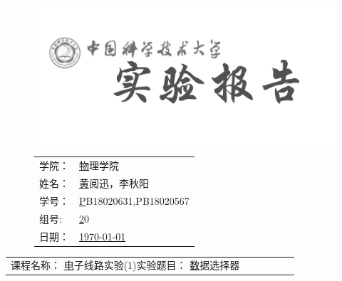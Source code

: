 \documentclass[a4paper,11pt,UTF8]{ctexart}
\newcommand{\major}{物理学院}
\newcommand{\name}{黄阅迅，李秋阳}
\newcommand{\stuid}{PB18020631,PB18020567}
\newcommand{\group}{20}
\newcommand{\newdate}{\today}
\newcommand{\course}{电子线路实验(1)}
\newcommand{\newtitle}{数据选择器}
\begin{document}
\thispagestyle{empty}
\begin{figure}[h]
  \begin{minipage}{0.6\linewidth}
    \centerline{\includegraphics[width=\linewidth]{logo.png}}
  \end{minipage}
  \hfill
  \begin{minipage}{.4\linewidth}
    \raggedleft
    \begin{tabular*}{.8\linewidth}{ll}
      学院： & \underline\major   \\
      姓名： & \underline\name    \\
      学号： & \underline\stuid   \\
      组号:  & \underline\group   \\
      日期： & \underline\newdate \\
    \end{tabular*}
  \end{minipage}
\end{figure}

\begin{table}[!htbp]
  \centering
  \begin{tabular*}{\linewidth}{llllll}
    课程名称：  \underline\course   \qquad\qquad 实验题目：  \underline\newtitle  
  \end{tabular*}
\end{table}


%
\newcommand{\p}{\par}
\newcommand{\np}{\par\noindent}
%
\newcommand{\expa}{用8选1数据选择器74LS151设计三输入多数表决电路}
\newcommand{\expb}{用两片74LS151实现逻辑函数: $Y=\sum m(6,7,8,11,13)$}
\newcommand{\expc}{试用8选1数据选择器74LS151产生逻辑函数：
$Y=AC'D+BC+BC'D'+A'B'CD$}
\newcommand{\expd}{用双4选1数据选择器74LS153实现一位全加器}
\newcommand{\chip}{数据选择器74LS151}
\end{document}
